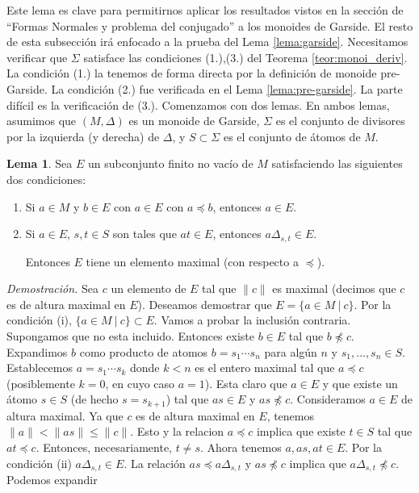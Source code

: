 \documentclass[12pt]{article}
\theoremstyle{definition}
\newtheorem{lema}{Lema}[section]
\providecommand{\norm}[1]{\lVert#1\rVert}
\begin{document}
Este lema es clave para permitirnos aplicar los resultados vistos en la sección de ``Formas Normales y problema del conjugado'' a los monoides de Garside. El resto de esta subsección irá enfocado a la prueba del Lema \ref{lema:garside}. Necesitamos verificar que $\Sigma$ satisface las condiciones (1.),(3.) del Teorema \ref{teor:monoi_deriv}. La condición (1.) la tenemos de forma directa por la definición de monoide pre-Garside. La condición (2.) fue verificada en el Lema \ref{lema:pre-garside}. La parte difícil es la verificación de (3.). Comenzamos con dos lemas. En ambos lemas, asumimos que $(M,\Delta)$ es un monoide de Garside, $\Sigma$ es el conjunto de divisores por la izquierda (y derecha) de $\Delta$, y $S\subset \Sigma$ es el conjunto de átomos de $M$.

\begin{lema}
Sea $E$ un subconjunto finito no vacío de $M$ satisfaciendo las siguientes dos condiciones:
\begin{enumerate}[label=(\roman*).]
\item Si $a\in M$ y $b\in E$ con $a\in E$ con $a\preceq b$, entonces $a\in E$.
\item Si $a\in E$, $s,t\in S$ son tales que $at\in E$, entonces $a\Delta_{s,t}\in E$.

Entonces $E$ tiene un elemento maximal (con respecto a $\preceq$).
\end{enumerate}
\end{lema}

\textit{Demostración.} Sea $c$ un elemento de $E$ tal que $\norm{c}$ es maximal (decimos que $c$ es de altura maximal en $E$). Deseamos demostrar que $E=\{a\in M\ |\ c\}$. Por la condición (i), $\{a\in M\ |\ c\}\subset E$. Vamos a probar la inclusión contraria. Supongamos que no esta incluido. Entonces existe $b\in E$ tal que $b\npreceq c$. Expandimos $b$ como producto de atomos $b=s_1\cdots s_n$ para algún $n$ y $s_1,\ldots,s_n\in S$. Establecemos $a=s_1\cdots s_k$ donde $k < n$ es el entero maximal tal que $a\preceq c$ (posiblemente $k=0$, en cuyo caso $a=1$). Esta claro que $a\in E$ y que existe un átomo $s\in S$ (de hecho $s=s_{k+1}$) tal que $as\in E$ y $as\npreceq c$. Consideramos $a\in E$ de altura maximal. Ya que $c$ es de altura maximal en $E$, tenemos $\norm{a}<\norm{as}\leq \norm{c}$. Esto y la relacion $a\preceq c$ implica que existe $t\in S$ tal que $at\preceq c$. Entonces, necesariamente, $t\neq s$. Ahora tenemos  $a,as, at\in E$. Por la condición (ii) $a\Delta_{s,t}\in E$. La relación $as\preceq a\Delta_{s,t}$ y $as\npreceq c$ implica que $a\Delta_{s,t}\npreceq c$. Podemos expandir
\end{document}
